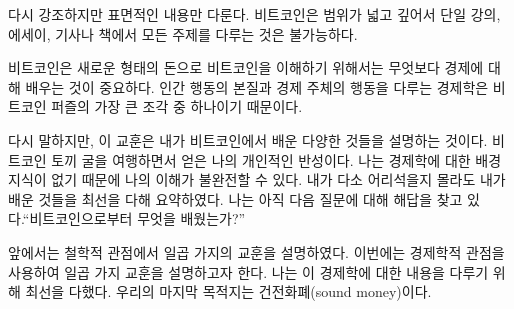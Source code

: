 다시 강조하지만 표면적인 내용만 다룬다. 
비트코인은 범위가 넓고 깊어서 단일 강의, 에세이, 기사나 책에서 모든 주제를 다루는 것은 불가능하다. 


비트코인은 새로운 형태의 돈으로 비트코인을 이해하기 위해서는 무엇보다 경제에 대해 배우는 것이 중요하다.
인간 행동의 본질과 경제 주체의 행동을 다루는 경제학은 비트코인 퍼즐의 가장 큰 조각 중 하나이기 때문이다.

다시 말하지만, 이 교훈은 내가 비트코인에서 배운 다양한 것들을 설명하는 것이다. 
비트코인 토끼 굴을 여행하면서 얻은 나의 개인적인 반성이다. 
나는 경제학에 대한 배경 지식이 없기 때문에 나의 이해가 불완전할 수 있다. 
내가 다소 어리석을지 몰라도 내가 배운 것들을 최선을 다해 요약하였다. 
나는 아직 다음 질문에 대해 해답을 찾고 있다.\enquote{비트코인으로부터 무엇을 배웠는가?}

앞에서는 철학적 관점에서 일곱 가지의 교훈을 설명하였다.
이번에는 경제학적 관점을 사용하여 일곱 가지 교훈을 설명하고자 한다. 
나는 이 경제학에 대한 내용을 다루기 위해 최선을 다했다.
우리의 마지막 목적지는 건전화폐(sound money)이다.

